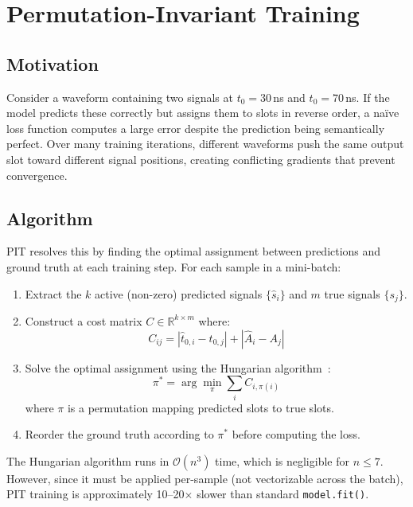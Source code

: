 \documentclass[11pt,twocolumn]{article}
\begin{document}
\section{Permutation-Invariant Training}
\label{sec:pit}

\subsection{Motivation}

Consider a waveform containing two signals at $t_0 = 30$\,ns and $t_0 = 70$\,ns.
If the model predicts these correctly but assigns them to slots in reverse order, a na\"ive loss function computes a large error despite the prediction being semantically perfect.
Over many training iterations, different waveforms push the same output slot toward different signal positions, creating conflicting gradients that prevent convergence.

\subsection{Algorithm}

PIT resolves this by finding the optimal assignment between predictions and ground truth at each training step.
For each sample in a mini-batch:

\begin{enumerate}
    \item Extract the $k$ active (non-zero) predicted signals $\{\hat{s}_i\}$ and $m$ true signals $\{s_j\}$.
    \item Construct a cost matrix $C \in \mathbb{R}^{k \times m}$ where:
    \begin{equation}
        C_{ij} = |\hat{t}_{0,i} - t_{0,j}| + |\hat{A}_i - A_j|
    \end{equation}
    \item Solve the optimal assignment using the Hungarian algorithm~\cite{kuhn1955hungarian}:
    \begin{equation}
        \pi^* = \arg\min_{\pi} \sum_i C_{i,\pi(i)}
    \end{equation}
    where $\pi$ is a permutation mapping predicted slots to true slots.
    \item Reorder the ground truth according to $\pi^*$ before computing the loss.
\end{enumerate}

The Hungarian algorithm runs in $\mathcal{O}(n^3)$ time, which is negligible for $n \leq 7$.
However, since it must be applied per-sample (not vectorizable across the batch), PIT training is approximately 10--20$\times$ slower than standard \texttt{model.fit()}.
\end{document}
